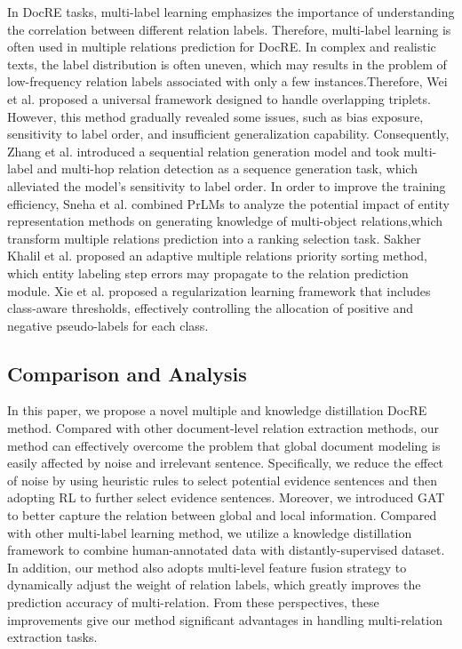 \documentclass[preprint,12pt]{elsarticle}
\begin{document}
In DocRE tasks, multi-label learning emphasizes the importance of understanding the correlation between different relation labels. Therefore, multi-label learning is often used in multiple relations prediction for DocRE. In complex and realistic texts, the label distribution is often uneven, which may results in the problem of low-frequency relation labels associated with only a few instances\cite{9684942}.Therefore, Wei et al.\cite{wei-etal-2020-novel} proposed a universal framework designed to handle overlapping triplets. However, this method gradually revealed some issues, such as bias exposure, sensitivity to label order, and insufficient generalization capability. Consequently, Zhang et al.\cite{zhang-etal-2021-multi-label-multi} introduced a  sequential relation generation model and took multi-label and multi-hop relation detection as a sequence generation task, which alleviated the model's sensitivity to label order. In order to improve the training efficiency, Sneha et al. \cite{singhania-etal-2023-extracting} combined PrLMs to analyze the potential impact of entity representation methods on generating knowledge of multi-object relations,which transform multiple relations prediction into a ranking selection task. Sakher Khalil et al.\cite{alqaaidi2023multiple} proposed an adaptive multiple relations priority sorting method, which entity labeling step errors may propagate to the relation prediction module. Xie et al.\cite{10.5555/3666122.3667241} proposed a regularization learning framework that includes class-aware thresholds, effectively controlling the allocation of positive and negative pseudo-labels for each class.

\subsection{Comparison and Analysis}\label{subsec4}

In this paper, we propose a novel multiple and knowledge distillation DocRE method. Compared with other document-level relation extraction methods, our method can effectively overcome the problem that global document modeling is easily affected by noise and irrelevant sentence. Specifically, we reduce the effect of noise by using heuristic rules to select potential evidence sentences and then adopting RL to further select evidence sentences. Moreover, we introduced GAT to better capture the relation between global and local information. Compared with other multi-label learning method, we utilize a knowledge distillation framework to combine human-annotated data with distantly-supervised dataset. In addition, our method also adopts multi-level feature fusion strategy to dynamically adjust the weight of relation labels, which greatly improves the prediction accuracy of multi-relation. From these perspectives, these improvements give our method significant advantages in handling multi-relation extraction tasks.
\end{document}
